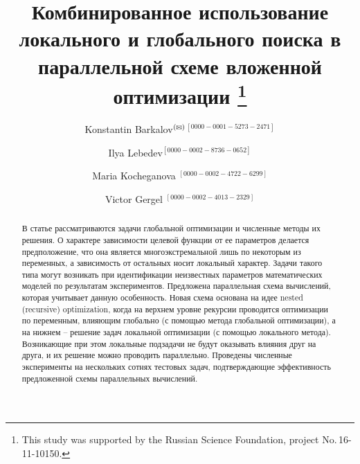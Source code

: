 \documentclass{svproc}
\def\orcidID#1{\unskip$^{[#1]}$}
\def\letter{$^{\textrm{(\Letter)}}$}
\begin{document}
\mainmatter              %
%
\title{ Комбинированное использование локального и глобального поиска в параллельной схеме вложенной оптимизации 
\thanks{This study was supported by the Russian Science Foundation, project No.\,16-11-10150.}
}
%
%
\author{Konstantin Barkalov\letter\orcidID{0000-0001-5273-2471} \and Ilya Lebedev\orcidID{0000-0002-8736-0652} \and Maria Kocheganova \orcidID{0000-0002-4722-6299} \and Victor Gergel \orcidID{0000-0002-4013-2329}}
%
%
%
	
\maketitle              %

\begin{abstract}

В статье рассматриваются задачи глобальной оптимизации и численные методы их решения. О характере зависимости целевой функции от ее параметров делается предположение, что она является многоэкстремальной лишь по некоторым из переменных, а зависимость от остальных носит локальный характер. Задачи такого типа могут возникать при идентификации неизвестных параметров математических моделей по результатам экспериментов. Предложена параллельная схема вычислений, которая учитывает данную особенность. Новая схема основана на идее nested (recursive) optimization, когда на верхнем уровне рекурсии проводится оптимизации по переменным, влияющим глобально (с помощью метода глобальной оптимизации), а на нижнем -- решение задач локальной оптимизации (с помощью локального метода). Возникающие при этом локальные подзадачи не будут оказывать влияния друг на друга, и их решение можно проводить параллельно. Проведены численные эксперименты на нескольких сотнях тестовых задач, подтверждающие эффективность предложенной схемы параллельных вычислений.


\end{abstract}
\end{document}
